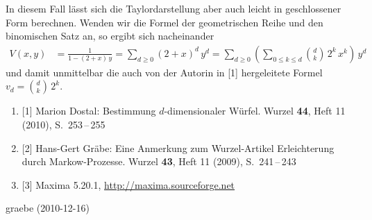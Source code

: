 \documentclass[10pt]{article}
\begin{document}
In diesem Fall lässt sich die Taylordarstellung aber auch leicht in
geschlossener Form berechnen. Wenden wir die Formel der geometrischen Reihe
und den binomischen Satz an, so ergibt sich nacheinander
\begin{align*} 
  V(x,y) & =\frac{1}{1-(2+x)\,y}=\sum_{d\ge 0}{(2+x)^d\,y^d}
  =\sum_{d\ge 0}{\left(\sum_{0\le k\le d}\binom{d}{k}\,2^k\,x^k\right)\,y^d}
\end{align*}
und damit unmittelbar die auch von der Autorin in [1] hergeleitete Formel $v
_d=\binom{d}{k}\,2^k$. 

\begin{enumerate}
\item{[1]} Marion Dostal: Bestimmung $d$-dimensionaler Würfel. Wurzel {\bf 44},
  Heft 11 (2010), S.\ 253\,--\,255
\item{[2]} Hans-Gert Gräbe: Eine Anmerkung zum Wurzel-Artikel
  {\glqq}Erleichterung durch Markow-Prozesse{\grqq}. Wurzel {\bf 43}, Heft 11
  (2009), S.\ 241\,--\,243
\item{[3]} Maxima 5.20.1, \url{http://maxima.sourceforge.net}
\end{enumerate}


\begin{attribution}
graebe (2010-12-16)
\end{attribution}
\end{document}
